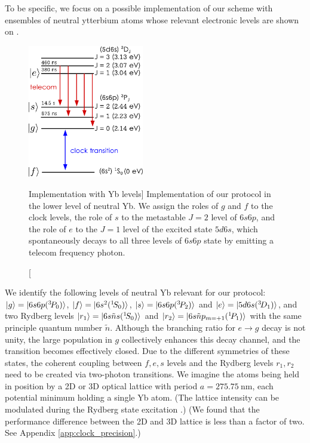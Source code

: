 To be specific, we focus on a possible implementation of our scheme with
ensembles of neutral ytterbium atoms whose relevant electronic levels are shown on
.
\begin{figure}[h]
\centering
\includegraphics[width=0.45\textwidth]{./figs_Komar2015/Yb_levels.pdf}
\caption
[Implementation with Yb levels]
{ 
\label{fig:Yb_levels}
Implementation of our protocol in the lower level of neutral Yb. We assign
the roles of $g$ and $f$ to the clock levels, the role of $s$ to the metastable
$J=2$ level of $6s6p$, and the role of $e$ to the $J=1$ level of the excited
state $5d6s$, which spontaneously decays to all three levels of $6s6p$ state by
emitting a telecom frequency photon.}
\end{figure}
We identify the  following levels of neutral
Yb  relevant for our protocol:
$| g \rangle =
| 6s6p({}^3\!P_0) \rangle$, $| f \rangle = | 6s^2({}^1\!S_0) \rangle$, $| s \rangle =
| 6s6p({}^3\!P_2) \rangle$ and $| e \rangle = | 5d6s({}^3\!D_1) \rangle$, and two Rydberg
levels $| r_1 \rangle = | 6s\tilde n s({}^1\!S_0) \rangle$ and $| r_2 \rangle =
| 6s\tilde n p_{m=+1}({}^1\!P_1) \rangle$ with the same principle
quantum number $\tilde n$. 
Although the branching ratio for $e\rightarrow g$ decay is not unity, the
large population in $g$ collectively enhances this decay channel, and the
transition becomes effectively closed. Due to the different symmetries of these
states, the coherent coupling between $f,e, s$ levels and the Rydberg levels
$r_1, r_2$ need to be created via two-photon transitions. We imagine the atoms
being held in position by a 2D or 3D optical lattice with period $a =
275.75~\mathrm{nm}$, each potential minimum holding a single Yb atom. (The lattice
intensity can be modulated during the Rydberg state excitation
\cite{Tiecke}.)  (We found that the performance difference between the 2D
and 3D lattice is less than a factor of two. See Appendix \ref{app:clock_precision}.)
 
